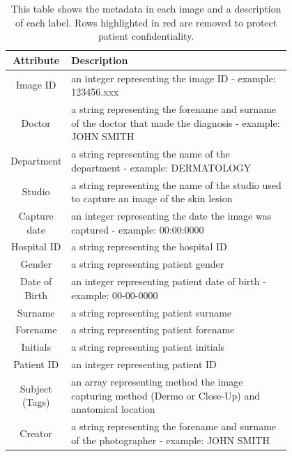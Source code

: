 \begin{table}
	\small
	\begin{tabular}{|c|p{0.8\linewidth}|}
		\hline
		Attribute      & Description
		\\
		\hline
		Image ID       & an integer representing the image ID - example: 123456.xxx
		\\
		\hline
		\rowcolor{Red}
		Doctor         & a string representing the forename and surname of the doctor that made the diagnosis - example: JOHN SMITH
		\\
		\hline
		\rowcolor{Red}
		Department     & a string representing the name of the department - example: DERMATOLOGY
		\\
		\hline
		\rowcolor{Red}
		Studio         & a string representing the name of the studio used to capture an image of the skin lesion
		\\
		\hline
		Capture date   & an integer representing the date the image was captured - example: 00:00:0000
		\\
		\hline
		\rowcolor{Red}
		Hospital ID    & a string representing the hospital ID
		\\
		\hline
		Gender         & a string representing patient gender
		\\
		\hline
		Date of Birth  & an integer representing patient date of birth - example: 00-00-0000
		\\
		\hline
		\rowcolor{Red}
		Surname        & a string representing patient surname
		\\
		\hline
		\rowcolor{Red}
		Forename       & a string representing patient forename
		\\
		\hline
		\rowcolor{Red}
		Initials       & a string representing patient initials
		\\
		\hline
		\rowcolor{Red}
		Patient ID     & an integer representing patient ID
		\\
		\hline
		Subject (Tags) & an array representing method the image capturing method (Dermo or Close-Up) and anatomical location
		\\
		\hline
		\rowcolor{Red}
		Creator        & a string representing the forename and surname of the photographer - example: JOHN SMITH
		\\
		\hline
	\end{tabular}
	\caption{This table shows the metadata in each image and a description of each label. Rows highlighted in red are removed to protect patient confidentiality.}
\end{table}\label{nhs-metadata}

